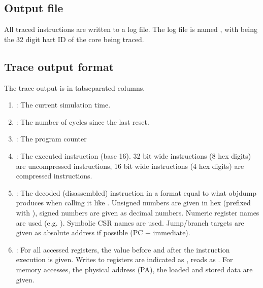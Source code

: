 \documentclass[letterpaper,10pt,english]{sphinxmanual}
\begin{document}
\subsection{Output file}
\label{\detokenize{verification:output-file}}
\sphinxAtStartPar
All traced instructions are written to a log file.
The log file is named , with  being the 32 digit hart ID of the core being traced.


\subsection{Trace output format}
\label{\detokenize{verification:trace-output-format}}
\sphinxAtStartPar
The trace output is in tab\sphinxhyphen{}separated columns.
\begin{enumerate}
%
\item {} 
\sphinxAtStartPar
{}: The current simulation time.

\item {} 
\sphinxAtStartPar
{}: The number of cycles since the last reset.

\item {} 
\sphinxAtStartPar
{}: The program counter

\item {} 
\sphinxAtStartPar
{}: The executed instruction (base 16).
32 bit wide instructions (8 hex digits) are uncompressed instructions, 16 bit wide instructions (4 hex digits) are compressed instructions.

\item {} 
\sphinxAtStartPar
{}: The decoded (disassembled) instruction in a format equal to what objdump produces when calling it like .
\sphinxhyphen{} Unsigned numbers are given in hex (prefixed with ), signed numbers are given as decimal numbers.
\sphinxhyphen{} Numeric register names are used (e.g. ).
\sphinxhyphen{} Symbolic CSR names are used.
\sphinxhyphen{} Jump/branch targets are given as absolute address if possible (PC + immediate).

\item {} 
\sphinxAtStartPar
{}: For all accessed registers, the value before and after the instruction execution is given. Writes to registers are indicated as , reads as . For memory accesses, the physical address (PA), the loaded and stored data are given.

\end{enumerate}
\end{document}
